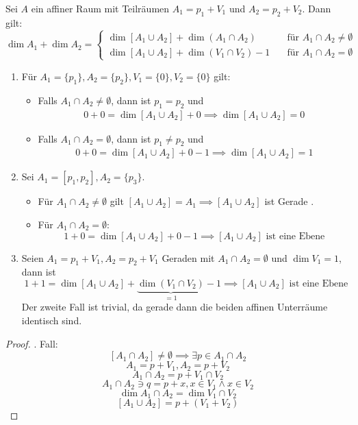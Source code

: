 \documentclass{mycourse}
\begin{document}
\begin{thm} 
	\label{thm:8.10}
Sei $A$ ein affiner Raum mit Teilräumen $A_1=p_1+V_1$ und $A_2=p_2+V_2$.
Dann gilt:
\[
	\boxed{
\dim A_1 +\dim A_2 = \begin{cases}
\dim [A_1\cup A_2] + \dim (A_1 \cap A_2) &\quad\text{für } A_1\cap A_2 \neq \emptyset \\
\dim [A_1 \cup A_2] + \dim (V_1 \cap V_2) - 1 &\quad\text{für } A_1\cap A_2 = \emptyset
\end{cases}
}
\]
\begin{ex}
\begin{enumerate}
\item
Für $A_1=\{p_1\}, A_2=\{p_2\}, V_1=\{0\}, V_2=\{0\}$ gilt:
\begin{itemize}
\item Falls $A_1\cap A_2 \neq \emptyset$, dann ist $p_1=p_2$ und
\begin{align*}
	0+0=\dim [A_1\cup A_2] + 0 \implies \dim[A_1\cup A_2] = 0
\end{align*}
\item Falls $A_1\cap A_2 = \emptyset$, dann ist $p_1\neq p_2$ und
\begin{align*}
	0+0= \dim [A_1\cup A_2] + 0 - 1 \implies \dim[A_1\cup A_2] = 1
\end{align*}

\end{itemize}

\item
Sei $A_1=[p_1,p_2], A_2=\{p_3\}$. 
\begin{itemize}
 \item Für $A_1\cap A_2 \neq \emptyset$ gilt $[A_1\cup A_2]=A_1 \implies [A_1 \cup A_2]$ ist Gerade .

\item Für $A_1\cap A_2=\emptyset$:
\[
1+0=\dim [A_1\cup A_2] + 0-1 \implies [A_1\cup A_2] \text{ ist eine Ebene}
\]
\end{itemize}
\item
Seien $A_1=p_1+V_1, A_2=p_2+V_1$ Geraden mit $A_1\cap A_2 = \emptyset$ und $\dim V_1 = 1$, dann ist
\[
	1+1=\dim [A_1 \cup A_2] + \underbrace{\dim (V_1 \cap V_2)}_{=1} - 1 \implies [A_1\cup A_2] \text{ ist eine Ebene}
\]
Der zweite Fall ist trivial, da gerade dann die beiden affinen Unterräume identisch sind. 
\end{enumerate}
\end{ex}

\begin{proof}
	. Fall:
\[
[A_1\cap A_2] \neq \emptyset \implies \exists p\in A_1 \cap A_2 \]\[
A_1=p+V_1, A_2=p+V_2 \]\[
A_1\cap A_2 = p+V_1\cap V_2\]\[
A_1\cap A_2 \ni q=p+x, x\in V_1 \land x\in V_2 \]\[
\dim A_1 \cap A_2 = \dim V_1 \cap V_2
\]
\[
[A_1\cup A_2] = p+(V_1+ V_2)
\]


\end{proof}
\end{thm}
\end{document}
